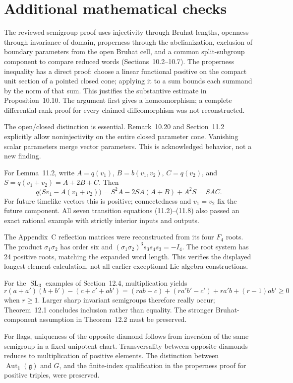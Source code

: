\documentclass[10pt]{article}
\begin{document}
\section*{Additional mathematical checks}
The reviewed semigroup proof uses injectivity through Bruhat lengths, openness through invariance of domain, properness through the abelianization, exclusion of boundary parameters from the open Bruhat cell, and a common split-subgroup component to compare reduced words (Sections 10.2–10.7). The properness inequality has a direct proof: choose a linear functional positive on the compact unit section of a pointed closed cone; applying it to a sum bounds each summand by the norm of that sum. This justifies the substantive estimate in Proposition 10.10. The argument first gives a homeomorphism; a complete differential-rank proof for every claimed diffeomorphism was not reconstructed.\par
The open/closed distinction is essential. Remark 10.20 and Section 11.2 explicitly allow noninjectivity on the entire closed parameter cone. Vanishing scalar parameters merge vector parameters. This is acknowledged behavior, not a new finding.\par
For Lemma 11.2, write \(A=q(v_1)\), \(B=b(v_1,v_2)\), \(C=q(v_2)\), and \(S=q(v_1+v_2)=A+2B+C\). Then \[q\big(Sv_1-A(v_1+v_2)\big)
 =S^2A-2SA(A+B)+A^2S=SAC.\] For future timelike vectors this is positive; connectedness and \(v_1=v_2\) fix the future component. All seven transition equations (11.2)–(11.8) also passed an exact rational example with strictly interior inputs and outputs.\par
The Appendix C reflection matrices were reconstructed from its four \(F_4\) roots. The product \(\sigma_1\sigma_2\) has order six and \((\sigma_1\sigma_2)^3s_3s_4s_3=-I_4\). The root system has 24 positive roots, matching the expanded word length. This verifies the displayed longest-element calculation, not all earlier exceptional Lie-algebra constructions.\par
For the \(\operatorname{SL}_3\) examples of Section 12.4, multiplication yields \[r(a+a')(b+b')-(c+c'+ab')
 =(rab-c)+(ra'b'-c')+ra'b+(r-1)ab'\geq0\] when \(r\geq1\). Larger sharp invariant semigroups therefore really occur; Theorem 12.1 concludes inclusion rather than equality. The stronger Bruhat-component assumption in Theorem 12.2 must be preserved.\par
For flags, uniqueness of the opposite diamond follows from inversion of the same semigroup in a fixed unipotent chart. Transversality between opposite diamonds reduces to multiplication of positive elements. The distinction between \(\operatorname{Aut}_1(\mathfrak g)\) and \(G\), and the finite-index qualification in the properness proof for positive triples, were preserved.\par
\end{document}
